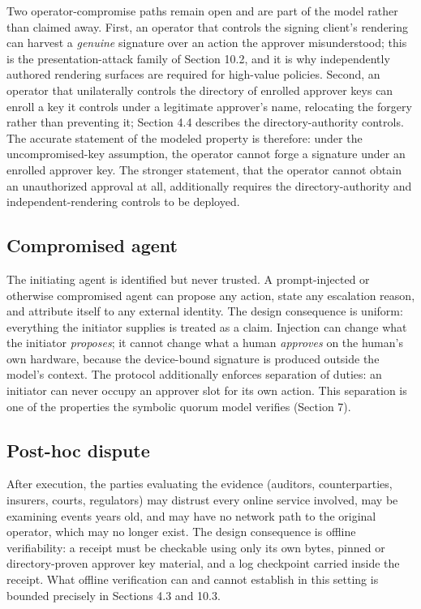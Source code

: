 \documentclass[11pt]{article}
\begin{document}
Two operator-compromise paths remain open and are part of the model rather than
claimed away. First, an operator that controls the signing client's rendering can
harvest a \emph{genuine} signature over an action the approver misunderstood; this
is the presentation-attack family of Section 10.2, and it is why independently
authored rendering surfaces are required for high-value policies. Second, an
operator that unilaterally controls the directory of enrolled approver keys can
enroll a key it controls under a legitimate approver's name, relocating the
forgery rather than preventing it; Section 4.4 describes the directory-authority
controls. The accurate statement of the modeled property is therefore: under the
uncompromised-key assumption, the operator cannot forge a signature under an
enrolled approver key. The stronger statement, that the operator cannot obtain an
unauthorized approval at all, additionally requires the directory-authority and
independent-rendering controls to be deployed.

\subsection{Compromised agent}

The initiating agent is identified but never trusted. A prompt-injected or
otherwise compromised agent can propose any action, state any escalation reason,
and attribute itself to any external identity. The design consequence is uniform:
everything the initiator supplies is treated as a claim. Injection can change what
the initiator \emph{proposes}; it cannot change what a human \emph{approves} on
the human's own hardware, because the device-bound signature is produced outside
the model's context. The protocol additionally enforces separation of duties: an
initiator can never occupy an approver slot for its own action. This separation is
one of the properties the symbolic quorum model verifies (Section 7).

\subsection{Post-hoc dispute}

After execution, the parties evaluating the evidence (auditors, counterparties,
insurers, courts, regulators) may distrust every online service involved, may be
examining events years old, and may have no network path to the original
operator, which may no longer exist. The design consequence is offline
verifiability: a receipt must be checkable using only its own bytes, pinned or
directory-proven approver key material, and a log checkpoint carried inside the
receipt. What offline verification can and cannot establish in this setting is
bounded precisely in Sections 4.3 and 10.3.
\end{document}
